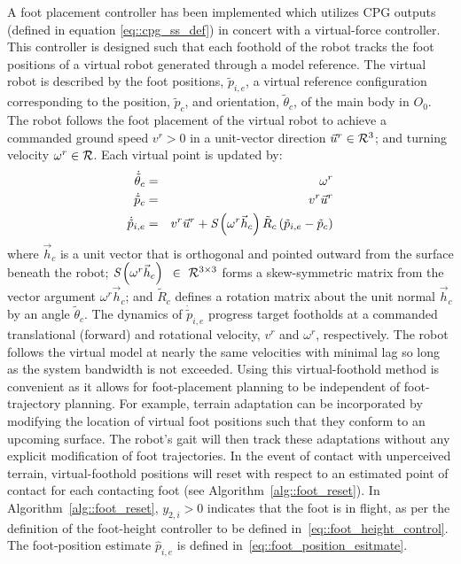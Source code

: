 		A foot placement controller has been implemented which utilizes CPG outputs (defined in equation \ref{eq::cpg_ss_def}) in concert with a virtual-force controller. This controller is designed such that each foothold of the robot tracks the foot positions of a virtual robot generated through a model reference. The virtual robot is described by the foot positions, $\tilde{p}_{i,e}$, a virtual reference configuration corresponding to the position, $\tilde{p}_{c}$, and orientation, $\tilde{\theta}_{c}$, of the main body in $O_{0}$. The robot follows the foot placement of the virtual robot to achieve a commanded ground speed $v^{r} > 0$ in a unit-vector direction $\vec{u}^{r} \in {\cal R}^{3}$; and turning velocity $\omega^{r} \in {\cal R}$. Each virtual point is updated by:
		\begin{eqnarray}
			\dot{\tilde{\theta}}_{c}	& = & \omega^{r} 				\nonumber\\
			\dot{\tilde{p}}_{c}			& = & v^{r}\vec{u}^{r}			\nonumber\\
			\dot{\tilde{p}}_{i,e} 		& = & v^{r}\vec{u}^{r} + \emph{S}\left(\omega^{r}\vec{h}_{c}\right) \tilde{R}_{c} \left(\tilde{p}_{i,e}-\tilde{p}_{c} \right) 
			\label{eq::virtual_foothold_control}
		\end{eqnarray}
		where $\vec{h}_{c}$ is a unit vector that is orthogonal and pointed outward from the surface beneath the robot; $\emph{S}\left(\omega^{r}\vec{h}_{c}\right)\text{ }\in\text{ }{\cal R}^{3\times3}$ forms a skew-symmetric matrix from the vector argument $\omega^{r}\vec{h}_{c}$; and $\tilde{R}_{c}$ defines a rotation matrix about the unit normal $\vec{h}_{c}$ by an angle $\tilde{\theta}_{c}$. The dynamics of $\dot{\tilde{p}}_{i,e}$ progress target footholds at a commanded translational (forward) and rotational velocity, $v^{r}$ and $\omega^{r}$, respectively. The robot follows the virtual model at nearly the same velocities with minimal lag so long as the system bandwidth is not exceeded. Using this virtual-foothold method is convenient as it allows for foot-placement planning to be independent of foot-trajectory planning. For example, terrain adaptation can be incorporated by modifying the location of virtual foot positions such that they conform to an upcoming surface. The robot's gait will then track these adaptations without any explicit modification of foot trajectories. In the event of contact with unperceived terrain, virtual-foothold positions will reset with respect to an estimated point of contact for each \Ith contacting foot (see Algorithm~\ref{alg::foot_reset}). In Algorithm~\ref{alg::foot_reset}, $y_{2,i}>0$ indicates that the \Ith foot is in flight, as per the definition of the foot-height controller to be defined in~\ref{eq::foot_height_control}. The foot-position estimate $\hat{p}_{i,e}$ is defined in~\ref{eq::foot_position_esitmate}.

